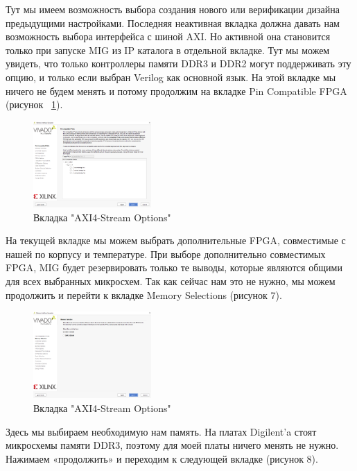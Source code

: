 \documentclass[a4paper,oneside ,14pt]{extreport}
\begin{document}
Тут мы имеем возможность выбора создания нового или верификации дизайна предыдущими настройками. Последняя неактивная вкладка должна давать нам возможность выбора интерфейса с шиной AXI. Но активной она становится только при запуске MIG из IP каталога в отдельной вкладке. Тут мы можем увидеть, что только контроллеры памяти DDR3 и DDR2 могут поддерживать эту опцию, и только если выбран Verilog как основной язык. На этой вкладке мы ничего не будем менять и потому продолжим на вкладке Pin Compatible FPGA (рисунок ~\ref{mig_2}).

\begin{figure}[h]
	\centering
	\includegraphics[width=0.4\textwidth]{image/mig_2.png}
	\caption{Вкладка "AXI4-Stream Options"}
	\label{mig_2}
\end{figure}

На текущей вкладке мы можем выбрать дополнительные FPGA, совместимые с нашей по корпусу и температуре. При выборе дополнительно совместимых FPGA, MIG будет резервировать только те выводы, которые являются общими для всех выбранных микросхем. Так как сейчас нам это не нужно, мы можем продолжить и перейти к вкладке Memory Selections (рисунок 7).

\begin{figure}[h]
	\centering
	\includegraphics[width=0.4\textwidth]{image/mig_3.png}
	\caption{Вкладка "AXI4-Stream Options"}
	\label{cordic_axi4_stream_options}
\end{figure}

Здесь мы выбираем необходимую нам память. На платах Digilent’a стоят микросхемы памяти DDR3, поэтому для моей платы ничего менять не нужно. Нажимаем «продолжить» и переходим к следующей вкладке (рисунок 8).
\end{document}
